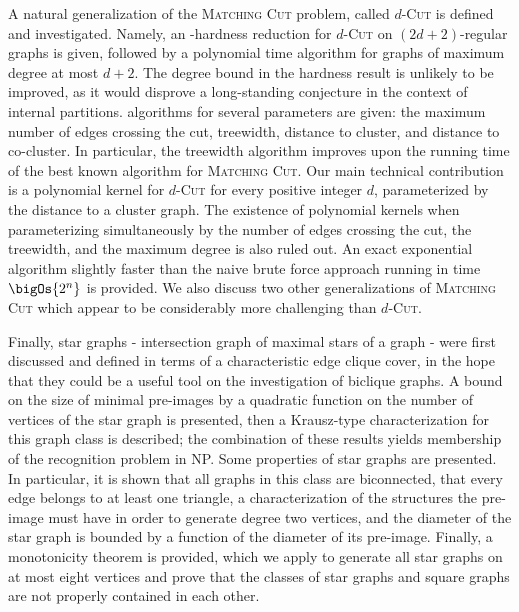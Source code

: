 A natural generalization of the \textsc{Matching Cut} problem, called \textsc{$d$-Cut} is defined and investigated.
Namely, an \NP-hardness reduction for \textsc{$d$-Cut} on $(2d+2)$-regular graphs is given, followed by a polynomial time algorithm for graphs of maximum degree at most $d+2$.
The degree bound in the hardness result is unlikely to be improved, as it would disprove a long-standing conjecture in the context of internal partitions.
\FPT algorithms for several parameters are given: the maximum number of edges crossing the cut, treewidth, distance to cluster, and distance to co-cluster.
In particular, the treewidth algorithm improves upon the running time of the best known algorithm for \textsc{Matching Cut}.
Our main technical contribution is a polynomial kernel for \textsc{$d$-Cut} for every positive integer $d$, parameterized by the distance to a cluster graph.
The existence of polynomial kernels when parameterizing simultaneously by the number of edges crossing the cut, the treewidth, and the maximum degree is also ruled out.
An exact exponential algorithm slightly faster than the naive brute force approach running in time $\bigOs{2^n}$ is provided.
We also discuss two other generalizations of \textsc{Matching Cut} which appear to be considerably more challenging than \textsc{$d$-Cut}.

Finally, star graphs - intersection graph of maximal stars of a graph - were first discussed and defined in terms of a characteristic edge clique cover, in the hope that they could be a useful tool on the investigation of biclique graphs.
A bound on the size of minimal pre-images by a quadratic function on the number of vertices of the star graph is presented, then a Krausz-type characterization for this graph class is described; the combination of these results yields membership of the recognition problem in \textsf{NP}.
Some properties of star graphs are presented. In particular, it is shown that all graphs in this class are biconnected, that every edge belongs to at least one triangle, a characterization of the structures the pre-image must have in order to generate degree two vertices, and the diameter of the star graph is bounded by a function of the diameter of its pre-image.
Finally, a monotonicity theorem is provided, which we apply to generate all star graphs on at most eight vertices and prove that the classes of star graphs and square graphs are not properly contained in each other.
